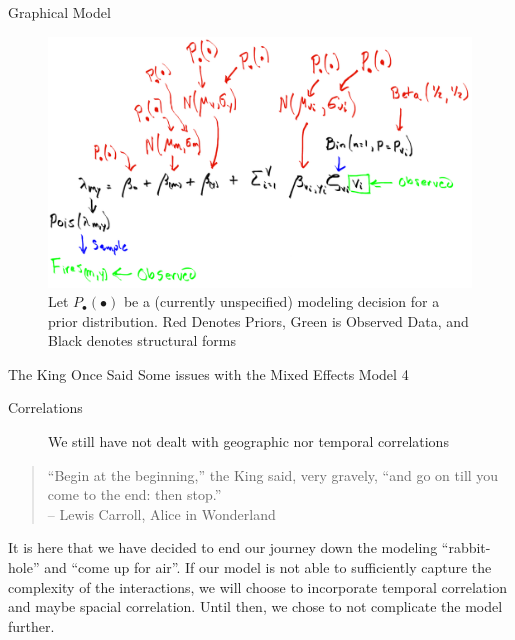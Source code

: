 \documentclass{beamer}
\begin{document}
\begin{frame}{Graphical Model}
\begin{figure}
	\centering
	\includegraphics[width=0.90\linewidth]{Hierarchial_Model_Drawing}
	\caption{Let $P_{\bullet}(\bullet)$ be a (currently unspecified) modeling decision for a prior distribution. Red Denotes Priors, Green is Observed Data, and Black denotes structural forms}
	\label{fig:Hierarchicalmodeldrawing}
\end{figure}
\end{frame}

\begin{frame}[t]{The King Once Said}
Some issues with the Mixed Effects Model 4
\begin{description}
\item[Correlations] We still have not dealt with geographic nor temporal correlations  
\end{description}

\pause 

\vspace{1cm}
\begin{quote}
``Begin at the beginning,'' the King said, very gravely, ``and go on till you come to the end: then stop.'' \\
-- Lewis Carroll, Alice in Wonderland
\end{quote}	
\vspace{1cm}

\pause 


It is here that we have decided to end our journey down the modeling ``rabbit-hole'' and ``come up for air''. If our model is not able to sufficiently capture the complexity of the interactions, we will choose to incorporate temporal correlation and maybe spacial correlation. Until then, we chose to not complicate the model further.

\end{frame}
\end{document}

